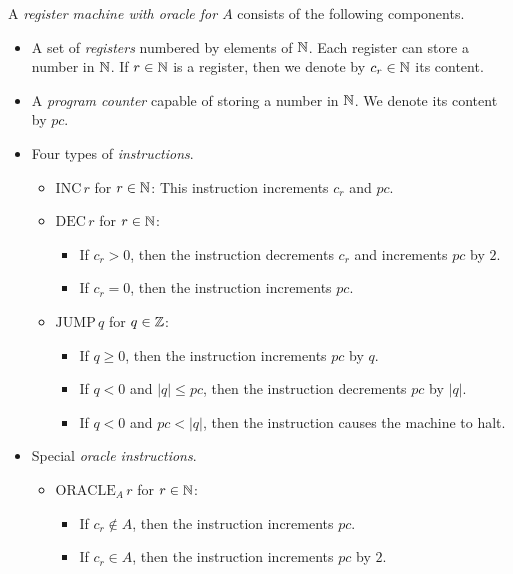 \documentclass[10pt]{amsart}
\begin{document}
\begin{definition}
	A \textit{register machine with oracle for $A$} consists of the following components.
	\begin{itemize}
		\item A set of \textit{registers} numbered by elements of ${\mathbb N}$. Each register can store a number in ${\mathbb N}$. If $r\in {\mathbb N}$ is a register, then we denote by $c_r\in {\mathbb N}$ its content.
		\item A \textit{program counter} capable of storing a number in ${\mathbb N}$. We denote its content by $pc$.
		\item Four types of \textit{instructions}.
		      \begin{itemize}
			      \item[] $\mathrm{INC}\,r$ for $r\in {\mathbb N}$: This instruction increments $c_r$ and $pc$.
			      \item[] $\mathrm{DEC}\,r$ for $r \in {\mathbb N}$:
				      \begin{itemize}
					      \item[] If $c_r > 0$, then the instruction decrements $c_r$ and increments $pc$ by $2$.
						      \item[]If $c_r = 0$, then the instruction increments $pc$.
				      \end{itemize}
			      \item[] $\mathrm{JUMP}\,q$ for $q \in {\mathbb Z}$:
				      \begin{itemize}
					      \item[] If $q \geq 0$, then the instruction increments $pc$ by $q$.
					      \item[] If $q < 0$ and $|q| \leq pc$, then the instruction decrements $pc$ by $|q|$.
					      \item[] If $q < 0$ and $pc < |q|$, then the instruction causes the machine to halt.
				      \end{itemize}
		      \end{itemize}
		\item Special \textit{oracle instructions}.
		      \begin{itemize}
			      \item[] $\mathrm{ORACLE}_A\,r$ for $r \in {\mathbb N}$:
				      \begin{itemize}
					      \item[] If $c_r \not \in A$, then the instruction increments $pc$.
					      \item[] If $c_r \in A$, then the instruction increments $pc$ by $2$.
				      \end{itemize}
		      \end{itemize}
	\end{itemize}
\end{definition}
\end{document}
